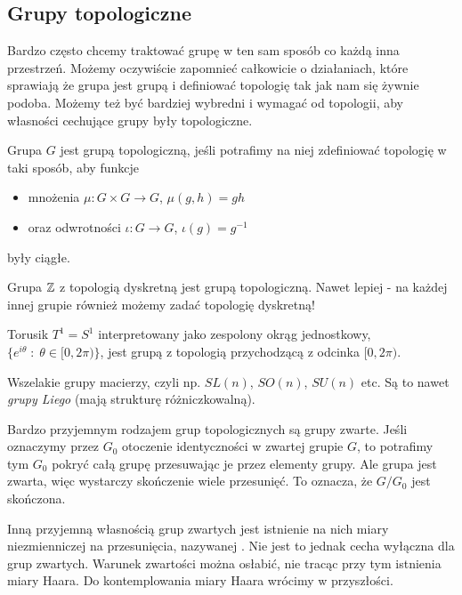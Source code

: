 \subsection{Grupy topologiczne}

Bardzo często chcemy traktować grupę w ten sam sposób co każdą inna przestrzeń. Możemy oczywiście zapomnieć całkowicie o działaniach, które sprawiają że grupa jest grupą i definiować topologię tak jak nam się żywnie podoba. Możemy też być bardziej wybredni i wymagać od topologii, aby własności cechujące grupy były topologiczne.

\begin{definition}{}{}
  Grupa $G$ jest grupą topologiczną, jeśli potrafimy na niej zdefiniować topologię w taki sposób, aby funkcje
  \begin{itemize}
    \item mnożenia $\mu:G\times G\to G$, $\mu(g,h)=gh$
    \item oraz odwrotności $\iota:G\to G$, $\iota(g)=g^{-1}$
  \end{itemize}
  były ciągłe.
\end{definition}

\begin{example}[m]
\item Grupa $\mathbb{Z}$ z topologią dyskretną jest grupą topologiczną. Nawet lepiej - na każdej innej grupie również możemy zadać topologię dyskretną!
\item Torusik $T^1=S^1$ interpretowany jako zespolony okrąg jednostkowy, $\{e^{i\theta}\;:\;\theta\in[0,2\pi)\}$, jest grupą z topologią przychodzącą z odcinka $[0,2\pi)$.
\item Wszelakie grupy macierzy, czyli np. $SL(n)$, $SO(n)$, $SU(n)$ etc. Są to nawet \emph{grupy Liego} (mają strukturę różniczkowalną).
\end{example}

Bardzo przyjemnym rodzajem grup topologicznych są grupy zwarte. Jeśli oznaczymy przez $G_0$ otoczenie identyczności w zwartej grupie $G$, to potrafimy tym $G_0$ pokryć całą grupę przesuwając je przez elementy grupy. Ale grupa jest zwarta, więc wystarczy skończenie wiele przesunięć. To oznacza, że $G/G_0$ jest skończona.

Inną przyjemną własnością grup zwartych jest istnienie na nich miary niezmienniczej na przesunięcia, nazywanej . Nie jest to jednak cecha wyłączna dla grup zwartych. Warunek zwartości można osłabić, nie tracąc przy tym istnienia miary Haara. Do kontemplowania miary Haara wrócimy w przyszłości.

